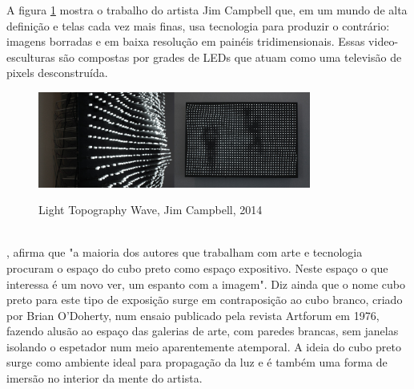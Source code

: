 A figura \ref{fig:jim_campbell} mostra o trabalho do artista Jim Campbell que, em um mundo de alta definição e telas cada vez mais finas, usa tecnologia para produzir o contrário: imagens borradas e em baixa resolução em painéis tridimensionais. Essas video-esculturas são compostas por grades de LEDs que atuam como uma televisão de pixels desconstruída. 

\begin{figure}[H]
    \centering
    \caption{Light Topography Wave, Jim Campbell, 2014}
	\vspace*{0,2cm}
    \includegraphics[width=0.8\textwidth]{./04-figuras/jim_campbell}
    \label{fig:jim_campbell}
\end{figure}
\vspace*{-0,9cm}
{\raggedright {}}\\

, afirma que "a maioria dos autores que trabalham com arte e tecnologia procuram o espaço do cubo preto como espaço expositivo. Neste espaço o que interessa é um novo ver, um espanto com a imagem". Diz ainda que o nome cubo preto para este tipo de exposição surge em contraposição ao cubo branco, criado por Brian O'Doherty, num ensaio publicado pela revista Artforum em 1976, fazendo alusão ao espaço das galerias de arte, com paredes brancas, sem janelas isolando o espetador num meio aparentemente atemporal. A ideia do cubo preto surge como ambiente ideal para propagação da luz e é também uma forma de imersão no interior da mente do artista.

